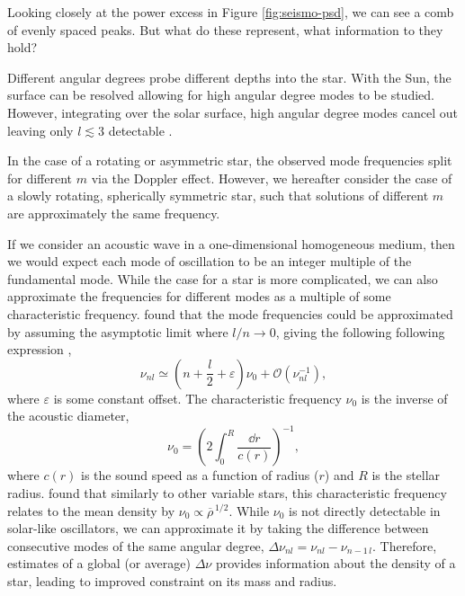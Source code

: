 Looking closely at the power excess in Figure \ref{fig:seismo-psd}, we can see a comb of evenly spaced peaks. But what do these represent, what information to they hold?

Different angular degrees probe different depths into the star. With the Sun, the surface can be resolved allowing for high angular degree modes to be studied. However, integrating over the solar surface, high angular degree modes cancel out leaving only \(l \lesssim 3\) detectable \needcite.

In the case of a rotating or asymmetric star, the observed mode frequencies split for different \(m\) via the Doppler effect. However, we hereafter consider the case of a slowly rotating, spherically symmetric star, such that solutions of different \(m\) are approximately the same frequency.

If we consider an acoustic wave in a one-dimensional homogeneous medium, then we would expect each mode of oscillation to be an integer multiple of the fundamental mode. While the case for a star is more complicated, we can also approximate the frequencies for different modes as a multiple of some characteristic frequency. \citet{Tassoul1980} found that the mode frequencies could be approximated by assuming the asymptotic limit where \(l/n \rightarrow 0\), giving the following following expression \citep{Gough1986},
%
\begin{equation}
    \nu_{nl} \simeq \left(n + \frac{l}{2} + \varepsilon\right) \nu_0 + \mathcal{O}(\nu_{nl}^{-1}), \label{eq:asy}
\end{equation}
%
where \(\varepsilon\) is some constant offset. The characteristic frequency \(\nu_0\) is the inverse of the acoustic diameter,
%
\begin{equation}
    \nu_0 = \left(2 \int_{0}^{R} \frac{\dd r}{c(r)}\right)^{-1},
\end{equation}
%
where \(c(r)\) is the sound speed as a function of radius (\(r\)) and \(R\) is the stellar radius. \citet{Gough1986} found that similarly to other variable stars, this characteristic frequency relates to the mean density by \(\nu_0 \propto \overline{\rho}^{\,1/2}\). While \(\nu_0\) is not directly detectable in solar-like oscillators, we can approximate it by taking the difference between consecutive modes of the same angular degree, \(\Delta\nu_{nl} = \nu_{nl} - \nu_{n-1\,l}\). Therefore, estimates of a global (or average) \(\Delta\nu\) provides information about the density of a star, leading to improved constraint on its mass and radius.

